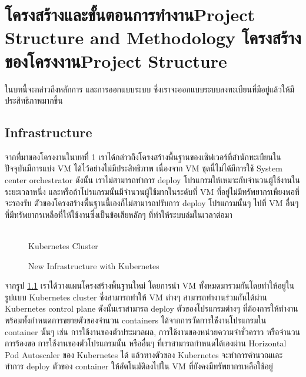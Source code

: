 \chapter{\ifproject%
\ifcpe โครงสร้างและขั้นตอนการทำงาน\else Project Structure and Methodology\fi
\else%
\ifcpe โครงสร้างของโครงงาน\else Project Structure\fi
\fi
}

ในบทนี้จะกล่าวถึงหลักการ และการออกแบบระบบ ซึ่งเราจะออกแบบระบบลงทะเบียนที่มีอยู่แล้วให้มีประสิทธิภาพมากขึ้น

\makeatletter

\section {Infrastructure}

จากที่มาของโครงงานในบทที่ 1 เราได้กล่าวถึงโครงสร้างพื้นฐานของเซิฟเวอร์ที่สำนักทะเบียนในปัจจุบันมีการแบ่ง VM \cite{vm} ได้ไว้อย่างไม่มีประสิทธิภาพ เนื่องจาก VM ชุดนี้ไม่ได้มีการใช้ System center orchestrator \cite{sco} ดังนั้น เราไม่สามารถทำการ deploy โปรแกรมให้เหมาะกับจำนวนผู้ใช้งานในระยะเวลาหนึ่ง และหรือถ้าโปรแกรมนั้นมีจำนวนผู้ใช้มากในระดับที่ VM ที่อยู่ไม่มีทรัพยากรเพืยงพอที่จะรองรับ ตัวของโครงสร้างพื้นฐานนี้เองก็ไม่สามารถปรับการ deploy โปรแกรมนั้นๆ ไปที่ VM อื่นๆ ที่มีทรัพยากรเหลือที่ให้ใช้งานซึ่งเป็นข้อเสียหลักๆ ที่ทำให้ระบบล่มในเวลาต่อมา

\begin{figure}[h]
    \centering
    \begin{center}
     \\
    Kubernetes Cluster
    \end{center}
    \caption[Poem]{New Infrastructure with Kubernetes}
    \label{fig:new_infra}
\end{figure}

จากรูป \ref{fig:new_infra} เราได้วางแผนโครงสร้างพื้นฐานใหม่ โดยการนำ VM ทั้งหมดมารวมกันโดยทำให้อยู่ในรูปแบบ Kubernetes cluster ซึ่งสามารถทำให้ VM ต่างๆ สามารถทำงานร่วมกันได้ผ่าน Kubernetes control plane \cite{kubecomp} ดังนั้นเราสามารถ deploy ตัวของโปรแกรมต่างๆ ที่ต้องการให้ทำงานพร้อมทั้งกำหนดการขยายตัวของจำนวน containers ได้จากการวัดการใช้่งานโปรแกรมใน container นั้นๆ เช่น การใช้งานของตัวประมวลผล, การใช้งานของหน่วยความจำชั่วคราว หรือจำนวนการร้องขอ การใช้งานของตัวโปรแกรมนั้น หรืออื่นๆ ที่เราสามารถกำหนดได้เองผ่าน Horizontal Pod Autoscaler \cite{kubehpa} ของ Kubernetes ได้ แล้วทางตัวของ Kubernetes จะทำการคำนวณและทำการ deploy ตัวของ container ให้อัตโนมัติลงไปใน VM ที่ยังคงมีทรัพยากรเหลือใช้อยู่

